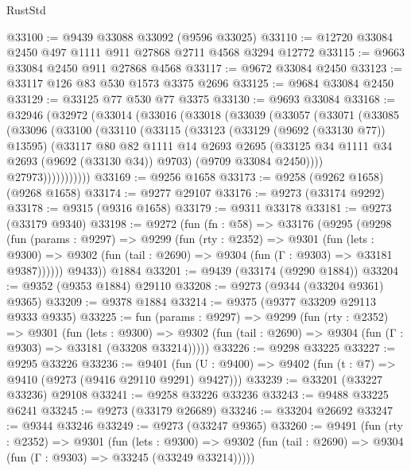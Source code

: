 \begin{lexlean}{RustStd}
\begin{coremodule}
{\begin{coremodule}
{{{{{{{{{{{{{{{{{{{{{{{{{{{{{{{{{{{{{{{{{{{{{{{{{{{{{{{@33100 := @9439 @33088 @33092 (@9596 @33025)
@33110 := @12720 @33084 @2450 @497 @1111 @911 @27868 @2711 @4568 @3294 @12772
@33115 := @9663 @33084 @2450 @911 @27868 @4568
@33117 := @9672 @33084 @2450
@33123 := @33117 @126 @83 @530 @1573 @3375 @2696
@33125 := @9684 @33084 @2450
@33129 := @33125 @77 @530 @77 @3375
@33130 := @9693 @33084
@33168 := @32946
    (@32972
      (@33014
        (@33016
          (@33018
            (@33039
              (@33057
                (@33071
                  (@33085
                    (@33096
                      (@33100
                        (@33110
                          (@33115
                            (@33123
                              (@33129 (@9692 (@33130 @77)) @13595)
                              (@33117
                                @80
                                @82
                                @1111
                                @14
                                @2693
                                @2695
                                (@33125 @34 @1111 @34 @2693 (@9692 (@33130 @34)) @9703)
                                (@9709 @33084 @2450))))
                          @27973)))))))))))
@33169 := @9256 @1658
@33173 := @9258 (@9262 @1658) (@9268 @1658)
@33174 := @9277 @29107
@33176 := @9273 (@33174 @9292)
@33178 := @9315 (@9316 @1658)
@33179 := @9311 @33178
@33181 := @9273 (@33179 @9340)
@33198 := @9272
    (fun (fn : @58) =>
    @33176
      (@9295
        (@9298
          (fun (params : @9297) =>
          @9299
            (fun (rty : @2352) =>
            @9301
              (fun (lets : @9300) =>
              @9302 (fun (tail : @2690) => @9304 (fun (Γ : @9303) => @33181 @9387))))))
        @9433))
    @1884
@33201 := @9439 (@33174 (@9290 @1884))
@33204 := @9352 (@9353 @1884) @29110
@33208 := @9273 (@9344 (@33204 @9361) @9365)
@33209 := @9378 @1884
@33214 := @9375 (@9377 @33209 @29113 @9333 @9335)
@33225 := fun (params : @9297) =>
  @9299
    (fun (rty : @2352) =>
    @9301
      (fun (lets : @9300) =>
      @9302 (fun (tail : @2690) => @9304 (fun (Γ : @9303) => @33181 (@33208 @33214)))))
@33226 := @9298 @33225
@33227 := @9295 @33226
@33236 := @9401
    (fun (U : @9400) => @9402 (fun (t : @7) => @9410 (@9273 (@9416 @29110 @9291) @9427)))
@33239 := @33201 (@33227 @33236) @29108
@33241 := @9258 @33226 @33236
@33243 := @9488 @33225 @6241
@33245 := @9273 (@33179 @26689)
@33246 := @33204 @26692
@33247 := @9344 @33246
@33249 := @9273 (@33247 @9365)
@33260 := @9491
    (fun (rty : @2352) =>
    @9301
      (fun (lets : @9300) =>
      @9302 (fun (tail : @2690) => @9304 (fun (Γ : @9303) => @33245 (@33249 @33214)))))
}}}}}}}}}}}}}}}}}}}}}}}}}}}}}}}}}}}}}}}}}}}}}}}}}}}}}}}
\end{coremodule}}
\end{coremodule}
\end{lexlean}
